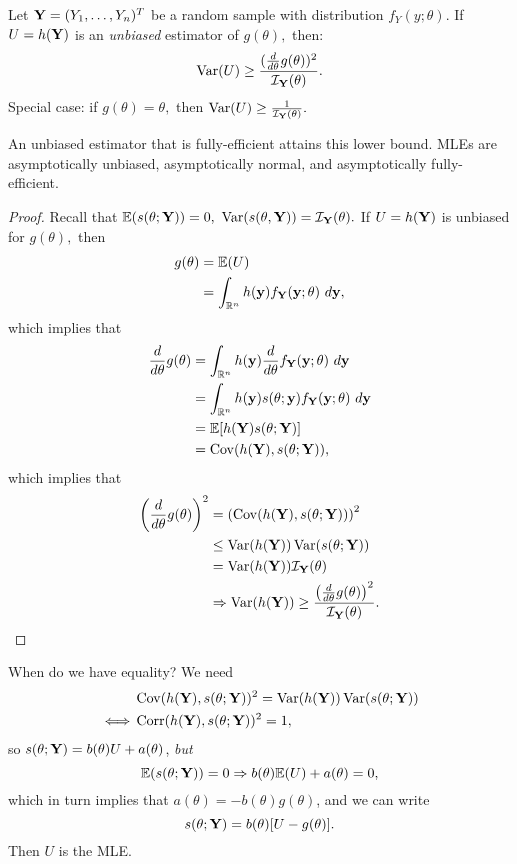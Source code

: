 \begin{theorem}
Let $\mathbf Y=(Y_1,\ldots,Y_n)^T$ be a random sample with distribution $f_Y(y;\theta)$. If $U=h(\mathbf Y)$ is an \textit{unbiased} estimator of $g(\theta),$ then:
$$
\operatorname*{Var}(U)\geq \frac{(\frac{d}{d\theta}g(\theta))^2}{\mathcal I_\mathbf Y(\theta)}.
$$
Special case: if $g(\theta)=\theta,$ then $\operatorname*{Var}(U)\geq \frac{1}{\mathcal I_\mathbf Y(\theta)}.$
\end{theorem}
An unbiased estimator that is fully-efficient attains this lower bound. MLEs are asymptotically unbiased, asymptotically normal, and asymptotically fully-efficient.
\begin{proof}
Recall that $\mathbb E(s(\theta;\mathbf Y))=0,$ $\operatorname*{Var}(s(\theta,\mathbf Y))=\mathcal I_\mathbf Y(\theta).$ If $U=h(\mathbf Y)$ is unbiased for $g(\theta),$ then 
\begin{align*}
    g(\theta)&=\mathbb E(U) \\
    &=\int_{\mathbb R^n}h(\mathbf y)f_\mathbf Y(\mathbf y;\theta) \ d\mathbf y,
\end{align*}
which implies that
\begin{align*}
    \der{\theta}g(\theta)&=\int_{\RR^n}h(\yy)\der{\theta}f_\YY(\yy;\theta)\ d\yy \\
    &=\int_{\RR^n}h(\yy)s(\theta;\yy)f_\YY(\yy;\theta) \ d\yy \\
    &=\EE[h(\YY)s(\theta;\YY)] \\
    &=\Cov(h(\YY),s(\theta;\YY)), 
\end{align*}
which implies that
\begin{align*}
    \left(\frac{d}{d\theta}g(\theta)\right)^2&=\left(\operatorname*{Cov}(h(\mathbf Y),s(\theta;\mathbf Y))\right)^2 \\
    &\leq \operatorname*{Var}(h(\mathbf Y))\operatorname*{Var}(s(\theta;\mathbf Y)) \\
    &=\operatorname*{Var}(h(\mathbf Y))\mathcal I_\mathbf Y(\theta) \\
    &\Rightarrow \operatorname*{Var}(h(\mathbf Y))\geq \frac{\left(\frac{d}{d\theta}g(\theta)\right)^2}{\mathcal I_\mathbf Y(\theta)}.
\end{align*}
\end{proof}
When do we have equality? We need 
\begin{align*}
&\operatorname*{Cov}(h(\mathbf Y),s(\theta;\mathbf Y))^2=\operatorname*{Var}(h(\mathbf Y))\operatorname*{Var}(s(\theta;\mathbf Y))\\
\;\Longleftrightarrow\; 
&\operatorname*{Corr}(h(\mathbf Y),s(\theta;\mathbf Y))^2=1,
\end{align*}
so $s(\theta;\mathbf Y)=b(\theta)U+a(\theta)$, \textit{but}
$$
\mathbb E(s(\theta;\mathbf Y))=0\Rightarrow b(\theta)\mathbb E(U)+a(\theta)=0,
$$
which in turn implies that $a(\theta)=-b(\theta)g(\theta)$, and we can write
$$
s(\theta;\mathbf Y)=b(\theta)[U-g(\theta)].
$$
Then $U$ is the MLE.

